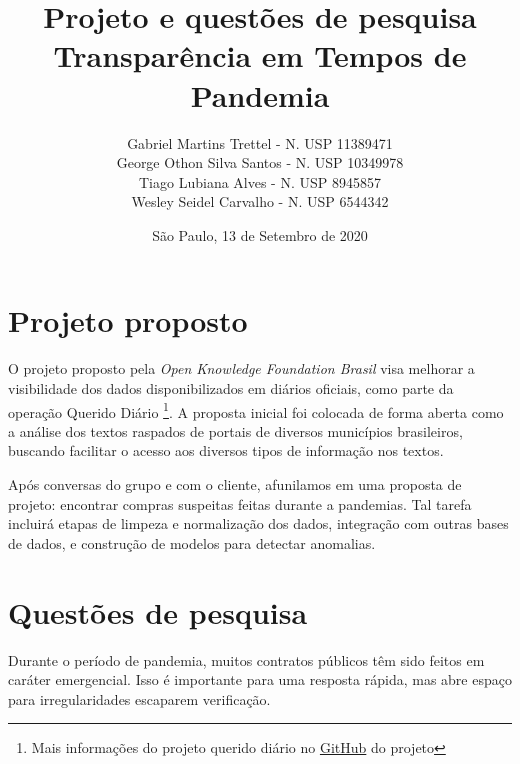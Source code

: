 \documentclass[10pt, a4paper]{article}
\begin{document}

\title{\textbf{  Projeto e questões de pesquisa  \\
                Transparência em Tempos de Pandemia
                }\\[2em] }

\author{ Gabriel Martins Trettel - N. USP 11389471  \\
         George Othon Silva Santos - N. USP 10349978 \\
         Tiago Lubiana Alves - N. USP 8945857 \\
         Wesley Seidel Carvalho - N. USP 6544342 \\
        }
\date{  São Paulo, 13 de Setembro de 2020  }
\maketitle

\section{Projeto proposto}

O projeto proposto pela \textit{Open Knowledge Foundation Brasil} visa melhorar a visibilidade dos dados disponibilizados em diários oficiais, como parte da operação Querido Diário \footnote {Mais informações do projeto querido diário no \href{https://github.com/okfn-brasil/querido-diario}{GitHub} do projeto}. A proposta inicial foi colocada de forma aberta como a análise dos textos raspados de portais de diversos municípios brasileiros, buscando facilitar o acesso aos diversos tipos de informação nos textos. 

Após conversas do grupo e com o cliente, afunilamos em uma proposta de projeto: encontrar compras suspeitas feitas durante a pandemias. Tal tarefa incluirá etapas de limpeza e normalização dos dados, integração com outras bases de dados, e construção de modelos para detectar anomalias. 


\section{Questões de pesquisa}

Durante o período de pandemia, muitos contratos públicos têm sido feitos em caráter emergencial. Isso é importante para uma resposta rápida, mas abre espaço para irregularidades escaparem verificação. 
\end{document}
